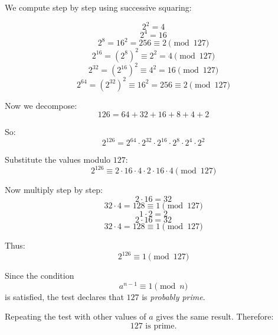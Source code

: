 We compute step by step using successive squaring:

\[
2^2 = 4
\]
\[
2^4 = 16
\]
\[
2^8 = 16^2 = 256 \equiv 2 \pmod{127}
\]
\[
2^{16} = (2^8)^2 \equiv 2^2 = 4 \pmod{127}
\]
\[
2^{32} = (2^{16})^2 \equiv 4^2 = 16 \pmod{127}
\]
\[
2^{64} = (2^{32})^2 \equiv 16^2 = 256 \equiv 2 \pmod{127}
\]

Now we decompose:
\[
126 = 64 + 32 + 16 + 8 + 4 + 2
\]

So:
\[
2^{126} = 2^{64} \cdot 2^{32} \cdot 2^{16} \cdot 2^8 \cdot 2^4 \cdot 2^2
\]

Substitute the values modulo $127$:
\[
2^{126} \equiv 2 \cdot 16 \cdot 4 \cdot 2 \cdot 16 \cdot 4 \pmod{127}
\]

Now multiply step by step:
\[
2 \cdot 16 = 32
\]
\[
32 \cdot 4 = 128 \equiv 1 \pmod{127}
\]
\[
1 \cdot 2 = 2
\]
\[
2 \cdot 16 = 32
\]
\[
32 \cdot 4 = 128 \equiv 1 \pmod{127}
\]

Thus:
\[
2^{126} \equiv 1 \pmod{127}
\]

Since the condition
\[
a^{n-1} \equiv 1 \pmod{n}
\]
is satisfied, the test declares that $127$ is \textit{probably prime}.

Repeating the test with other values of $a$ gives the same result. Therefore:
\[
127 \text{ is prime.}
\]
